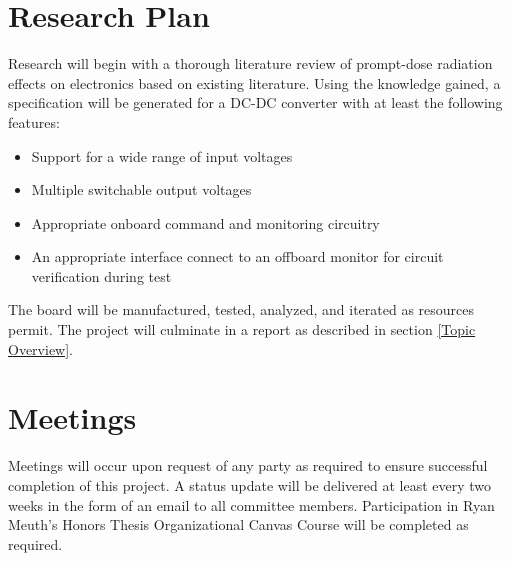 \documentclass{article}
\begin{document}
\section{Research Plan}
    Research will begin with a thorough literature review of prompt-dose radiation effects on electronics based on existing literature.  Using the knowledge gained, a specification will be generated for a DC-DC converter
    with at least the following features:
    \begin{itemize}
        \item Support for a wide range of input voltages
        \item Multiple switchable output voltages
        \item Appropriate onboard command and monitoring circuitry
        \item An appropriate interface connect to an offboard monitor for circuit verification during test
    \end{itemize}
    The board will be manufactured, tested, analyzed, and iterated as resources permit.  The project will culminate in a report as described in section \ref{Topic Overview}.

\section{Meetings}
    Meetings will occur upon request of any party as required to ensure successful completion of this project.  A status update will be delivered at least every two weeks in the form of an email to
    all committee members.  Participation in Ryan Meuth's Honors Thesis Organizational Canvas Course will be completed as required.
\end{document}
